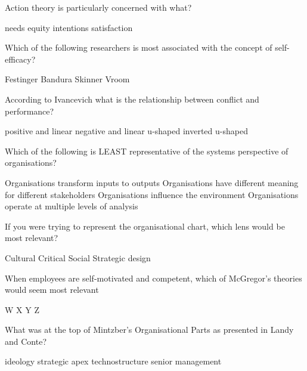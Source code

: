 \documentclass[12pt, a4paper]{exam}\usepackage[]{graphicx}\usepackage[]{color}
\begin{document}
\begin{questions}
\filbreak
\question
 Action theory is particularly concerned with what?
\begin{choices}
\choice needs
\choice equity
\choice intentions
\choice satisfaction
\vspace{10 mm}
\end{choices}


\filbreak
\question
 Which of the following researchers is most associated with the concept of self-efficacy?
\begin{choices}
\choice Festinger
\choice Bandura
\choice Skinner
\choice Vroom
\vspace{10 mm}
\end{choices}


\filbreak
\question
 According to Ivancevich what is the relationship between conflict and performance?
\begin{choices}
\choice positive and linear
\choice negative and linear
\choice u-shaped
\choice inverted u-shaped
\vspace{10 mm}
\end{choices}


\filbreak
\question
 Which of the following is LEAST representative of the systems perspective of organisations?
\begin{choices}
\choice Organisations transform inputs to outputs
\choice Organisations have different meaning for different stakeholders
\choice Organisations influence the environment
\choice Organisations operate at multiple levels of analysis
\vspace{10 mm}
\end{choices}


\filbreak
\question
 If you were trying to represent the organisational chart, which lens would be most relevant?
\begin{choices}
\choice Cultural
\choice Critical
\choice Social
\choice Strategic design
\vspace{10 mm}
\end{choices}


\filbreak
\question
 When employees are self-motivated and competent, which of McGregor's theories would seem most relevant
\begin{choices}
\choice W
\choice X
\choice Y
\choice Z
\vspace{10 mm}
\end{choices}


\filbreak
\question
 What was at the top of Mintzber's Organisational Parts as presented in Landy and Conte?
\begin{choices}
\choice ideology
\choice strategic apex
\choice technostructure
\choice senior management
\vspace{10 mm}
\end{choices}



\end{questions}
\end{document}
